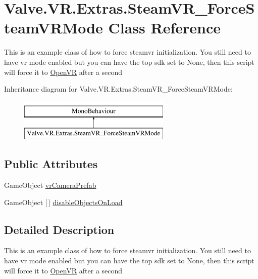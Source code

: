 \hypertarget{class_valve_1_1_v_r_1_1_extras_1_1_steam_v_r___force_steam_v_r_mode}{}\section{Valve.\+V\+R.\+Extras.\+Steam\+V\+R\+\_\+\+Force\+Steam\+V\+R\+Mode Class Reference}
\label{class_valve_1_1_v_r_1_1_extras_1_1_steam_v_r___force_steam_v_r_mode}


This is an example class of how to force steamvr initialization. You still need to have vr mode enabled but you can have the top sdk set to None, then this script will force it to \mbox{\hyperlink{class_valve_1_1_v_r_1_1_open_v_r}{Open\+VR}} after a second  


Inheritance diagram for Valve.\+V\+R.\+Extras.\+Steam\+V\+R\+\_\+\+Force\+Steam\+V\+R\+Mode\+:\begin{figure}[H]
\begin{center}
\leavevmode
\includegraphics[height=2.000000cm]{class_valve_1_1_v_r_1_1_extras_1_1_steam_v_r___force_steam_v_r_mode}
\end{center}
\end{figure}
\subsection*{Public Attributes}
\begin{DoxyCompactItemize}
\item 
Game\+Object \mbox{\hyperlink{class_valve_1_1_v_r_1_1_extras_1_1_steam_v_r___force_steam_v_r_mode_ab648212448fc26dcb456e692f01b89c8}{vr\+Camera\+Prefab}}
\item 
Game\+Object \mbox{[}$\,$\mbox{]} \mbox{\hyperlink{class_valve_1_1_v_r_1_1_extras_1_1_steam_v_r___force_steam_v_r_mode_a9d1e51db77729473daef26fae736a1f3}{disable\+Objects\+On\+Load}}
\end{DoxyCompactItemize}


\subsection{Detailed Description}
This is an example class of how to force steamvr initialization. You still need to have vr mode enabled but you can have the top sdk set to None, then this script will force it to \mbox{\hyperlink{class_valve_1_1_v_r_1_1_open_v_r}{Open\+VR}} after a second 



